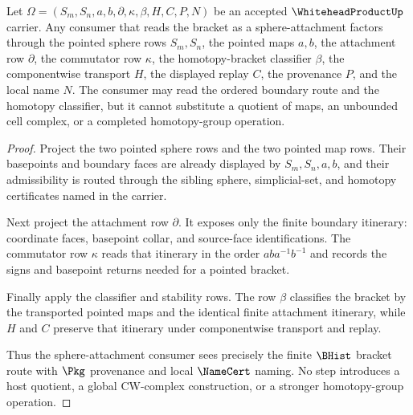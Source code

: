\begin{theorem}
\label{thm:whitehead-product-sphere-attachment-route}
Let $\Omega=(S_m,S_n,a,b,\partial,\kappa,\beta,H,C,P,N)$ be an accepted $\WhiteheadProductUp$ carrier. Any consumer that reads the bracket as a sphere-attachment factors through the pointed sphere rows $S_m,S_n$, the pointed maps $a,b$, the attachment row $\partial$, the commutator row $\kappa$, the homotopy-bracket classifier $\beta$, the componentwise transport $H$, the displayed replay $C$, the provenance $P$, and the local name $N$. The consumer may read the ordered boundary route and the homotopy classifier, but it cannot substitute a quotient of maps, an unbounded cell complex, or a completed homotopy-group operation.
\end{theorem}
\begin{proof}
Project the two pointed sphere rows and the two pointed map rows. Their basepoints and boundary faces are already displayed by $S_m,S_n,a,b$, and their admissibility is routed through the sibling sphere, simplicial-set, and homotopy certificates named in the carrier.

Next project the attachment row $\partial$. It exposes only the finite boundary itinerary: coordinate faces, basepoint collar, and source-face identifications. The commutator row $\kappa$ reads that itinerary in the order $a b a^{-1} b^{-1}$ and records the signs and basepoint returns needed for a pointed bracket.

Finally apply the classifier and stability rows. The row $\beta$ classifies the bracket by the transported pointed maps and the identical finite attachment itinerary, while $H$ and $C$ preserve that itinerary under componentwise transport and replay.

Thus the sphere-attachment consumer sees precisely the finite $\BHist$ bracket route with $\Pkg$ provenance and local $\NameCert$ naming. No step introduces a host quotient, a global CW-complex construction, or a stronger homotopy-group operation.
\end{proof}


